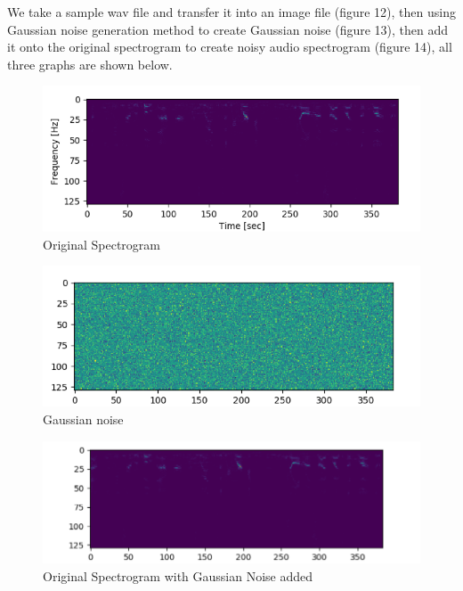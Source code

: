 \documentclass[runningheads,a4paper]{llncs}
\begin{document}
We take a sample wav file and transfer it into an image file (figure 12), then using Gaussian noise generation method to create Gaussian noise (figure 13), then add it onto the original spectrogram to create noisy audio spectrogram (figure 14), all three graphs are shown below.\\

\begin{figure}[H]
\includegraphics[scale=0.25]{figureA.png}
\caption{Original Spectrogram}
\label{fig:framework}
\end{figure}

\begin{figure}[H]
\includegraphics[scale=0.25]{figureB.png}
\caption{Gaussian noise}
\label{fig:framework}
\end{figure}

\begin{figure}[H]
\includegraphics[scale=0.25]{figureC.png}
\caption{Original Spectrogram with Gaussian Noise added}
\label{fig:framework}
\end{figure}
\end{document}
